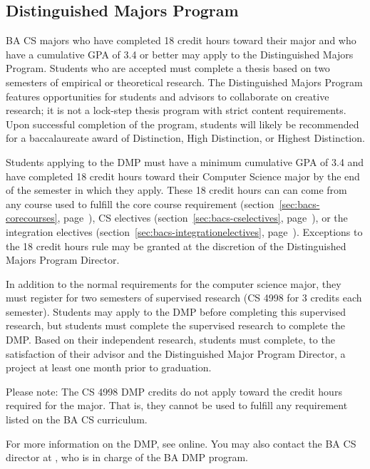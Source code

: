 \subsection{Distinguished Majors Program}
\label{sec:badmp}

BA CS majors who have completed 18 credit hours toward their major
and who have a cumulative GPA of 3.4 or better may apply to the
Distinguished Majors Program. Students who are accepted must complete
a thesis based on two semesters of empirical or theoretical
research. The Distinguished Majors Program features opportunities for
students and advisors to collaborate on creative research; it is not a
lock-step thesis program with strict content requirements. Upon
successful completion of the program, students will likely be
recommended for a baccalaureate award of Distinction, High
Distinction, or Highest Distinction.

Students applying to the DMP must have a minimum cumulative GPA of 3.4
and have completed 18 credit hours toward their Computer Science major
by the end of the semester in which they apply. These 18 credit hours
can can come from any course used to fulfill the core course
requirement (section~\ref{sec:bacs-corecourses},
page~\pageref{sec:bacs-corecourses}), CS electives
(section~\ref{sec:bacs-cselectives},
page~\pageref{sec:bacs-cselectives}), or the integration electives
(section~\ref{sec:bacs-integrationelectives},
page~\pageref{sec:bacs-integrationelectives}).
Exceptions to the 18 credit hours rule may be granted at the
discretion of the Distinguished Majors Program Director.

In addition to the normal requirements for the computer science major,
they must register for two semesters of supervised research (CS 4998
for 3 credits each semester). Students may apply to the DMP before
completing this supervised research, but students must complete the
supervised research to complete the DMP. Based on their independent
research, students must complete, to the satisfaction of their advisor
and the Distinguished Major Program Director, a project at least one
month prior to graduation.

Please note: The CS 4998 DMP credits do not apply toward the credit
hours required for the major. That is, they cannot be used to fulfill
any requirement listed on the BA CS curriculum.

For more information on the DMP, see
online.
You may also contact the BA CS director at \bacsdirectoremail, who is
in charge of the BA DMP program.

